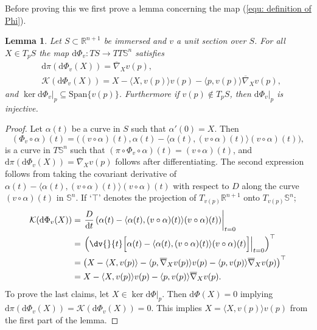 \documentclass[12pt]{amsart}
\theoremstyle{plain}
\newtheorem{Lem}{Lemma}
\theoremstyle{definition}
\def\R{\mathbb{R}}
\def\S{\mathbb{S}}
\newcommand{\td}{\mathrm{d}}
\numberwithin{equation}{section}
\begin{document}
Before proving this we first prove a lemma concerning the map (\ref{equ: definition of Phi}).
\begin{Lem}\label{Lem: derivative of Phi_v}
    Let $S\subset \R^{n+1}$ be immersed and $v$ a unit section over $S$. For all $X\in T_pS$ the map $\td\Phi_v:TS\to TT\S^n$ satisfies
    \begin{equation}\label{eq: derivative of Phi_v}
    \begin{aligned}
        &\td\pi(\td\Phi_v(X))=\overline\nabla_Xv(p),\\ &\mathcal{K}(\td\Phi_v(X))=X-\langle X,v(p)\rangle v(p)-\langle p, v(p)\rangle \overline\nabla_X v(p),
    \end{aligned}
    \end{equation}
    and $\ker \td\Phi_v|_p \subseteq \mbox{Span}\{v(p)\}$. Furthermore if $v(p)\notin T_pS$, then $\td\Phi_v|_p$ is injective.
\end{Lem}
\begin{proof}
    Let $\alpha(t)$ be a curve in $S$ such that $\alpha'(0)=X$. Then  
\[
(\Phi_v\circ \alpha)(t)=\big((v\circ\alpha)(t),\alpha(t)-\langle\alpha(t),(v\circ\alpha)(t)\rangle (v\circ\alpha)(t)\big),
\]
is a curve in $T\mathbb{S}^n$ such that $(\pi\circ\Phi_v\circ\alpha)(t)=(v\circ\alpha)(t)$, and $\td\pi(\td\Phi_v(X))=\overline\nabla_Xv(p)$ follows after differentiating. The second expression follows from taking the covariant derivative of $\alpha(t)-\langle\alpha(t),(v\circ\alpha)(t)\rangle (v\circ\alpha)(t)$ with respect to $D$ along the curve $(v\circ\alpha)(t)$ in $\S^n$.  If `$\top$' denotes the projection of $T_{v(p)}\mathbb{R}^{n+1}$ onto $T_{v(p)}\S^n$;
\begin{align*}
    \mathcal{K}(\td\Phi_v(X))&=\left.\frac{D}{\td t}\left(\alpha(t)-\langle\alpha(t),(v\circ\alpha)(t)\rangle (v\circ\alpha)(t)\right)\right|_{t=0}\\
    &=\left.\left(\dv{}{t}\Big[ \alpha(t)-\langle\alpha(t),(v\circ\alpha)(t)\rangle (v\circ\alpha)(t)\Big]\right|_{t=0}\right)^\top\\
    &=\left(X-\langle X,v(p)\rangle-\langle p,\overline\nabla_Xv(p)\rangle v(p)-\langle p,v(p)\rangle\overline\nabla_Xv(p)\right)^\top\\
    &=X-\langle X,v(p)\rangle v(p)-\langle p, v(p)\rangle \overline\nabla_X v(p).
\end{align*}
To prove the last claims, let $X\in\ker \td\Phi|_p$. Then $\td\Phi(X)=0$ implying $\td\pi(\td\Phi_v(X))=\mathcal{K}(\td\Phi_v(X))=0$. This implies $X=\langle X,v(p)\rangle v(p)$ from the first part of the lemma.
\end{proof}
\end{document}
